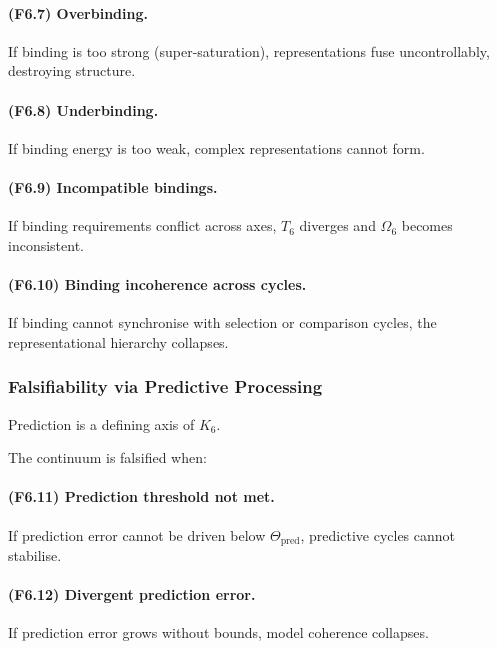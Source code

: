 \paragraph{(F6.7) Overbinding.}
If binding is too strong (super-saturation),
representations fuse uncontrollably, destroying structure.

\paragraph{(F6.8) Underbinding.}
If binding energy is too weak,
complex representations cannot form.

\paragraph{(F6.9) Incompatible bindings.}
If binding requirements conflict across axes,
$T_6$ diverges and $\Omega_6$ becomes inconsistent.

\paragraph{(F6.10) Binding incoherence across cycles.}
If binding cannot synchronise with selection or comparison cycles,
the representational hierarchy collapses.



\subsubsection{Falsifiability via Predictive Processing}

Prediction is a defining axis of $K_6$.

The continuum is falsified when:

\paragraph{(F6.11) Prediction threshold not met.}
If prediction error cannot be driven below $\Theta_{\mathrm{pred}}$,
predictive cycles cannot stabilise.

\paragraph{(F6.12) Divergent prediction error.}
If prediction error grows without bounds,
model coherence collapses.

